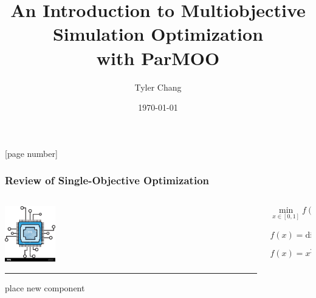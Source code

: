 \documentclass[aspectratio=169]{beamer}
\title{An Introduction to Multiobjective Simulation Optimization\\with ParMOO}
\author{Tyler Chang}
\institute{Mathematics and Computer Science Division,\\
Argonne National Laboratory}
\date{\today}
\begin{document}
{

\frame{\titlepage}
}

[page number]{}

\begin{frame}\frametitle{Review of Single-Objective Optimization}
\begin{columns}
\begin{column}{0.5\textwidth}
\begin{center}

\pause
\includegraphics[width=0.2\textwidth]{chip-icon.jpg}

\bigskip
\bigskip

\pause

\hrule

{\small place new component}

\end{center}
\end{column}
\begin{column}{0.5\textwidth}
\bigskip
{\Large

\pause
$$
\min_{x\in[0,1]} f(x)
$$

\pause
$$
f(x) = \text{dist}(x, \text{chip})^2
$$

\pause
$$
f(x) = x^2
$$
}
\end{column}
\end{columns}
\end{frame}
\end{document}
